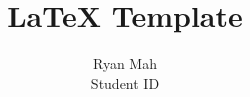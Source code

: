 \documentclass[12pt]{article}
\begin{document}
\title{LaTeX Template}
\author{Ryan Mah \\ Student ID}
\date{\vspace{-2ex}}
\maketitle


\end{document}
